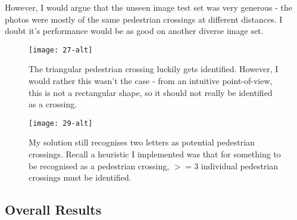 \documentclass{article}  %
\begin{document}
	However, I would argue that the unseen image test set was very generous - the photos were mostly of the same pedestrian crossings at different distances. I doubt it's performance would be as good on another diverse image set.
	
	\begin{figure}[H]
		\begin{minipage}[c]{0.45\linewidth}
			\centering
			\texttt{[image: 27-alt]}
			\caption{The triangular pedestrian crossing luckily gets identified. However, I would rather this wasn't the case - from an intuitive point-of-view, this is not a rectangular shape, so it should not really be identified as a crossing.}
			\label{shape-analysis-img}
		\end{minipage}\hfill
		\begin{minipage}[c]{0.45\linewidth}
			\centering
			\texttt{[image: 29-alt]}
			\caption{My solution still recognises two letters as potential pedestrian crossings. Recall a heuristic I implemented was that for something to be recognised as a pedestrian crossing, $>= 3$ individual pedestrian crossings must be identified.}
			\label{bus-lane}
		\end{minipage}
	\end{figure}
	
	\subsection{Overall Results}
	
\end{document}
